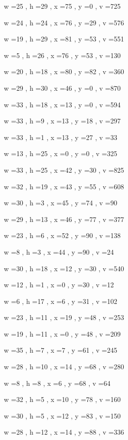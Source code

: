 \documentclass[11pt]{article}
\begin{document}
w =25 , h =29 , x =75 , y =0 , v =725
\par
w =24 , h =24 , x =76 , y =29 , v =576
\par
w =19 , h =29 , x =81 , y =53 , v =551
\par
w =5 , h =26 , x =76 , y =53 , v =130
\par
w =20 , h =18 , x =80 , y =82 , v =360
\par
w =29 , h =30 , x =46 , y =0 , v =870
\par
w =33 , h =18 , x =13 , y =0 , v =594
\par
w =33 , h =9 , x =13 , y =18 , v =297
\par
w =33 , h =1 , x =13 , y =27 , v =33
\par
w =13 , h =25 , x =0 , y =0 , v =325
\par
w =33 , h =25 , x =42 , y =30 , v =825
\par
w =32 , h =19 , x =43 , y =55 , v =608
\par
w =30 , h =3 , x =45 , y =74 , v =90
\par
w =29 , h =13 , x =46 , y =77 , v =377
\par
w =23 , h =6 , x =52 , y =90 , v =138
\par
w =8 , h =3 , x =44 , y =90 , v =24
\par
w =30 , h =18 , x =12 , y =30 , v =540
\par
w =12 , h =1 , x =0 , y =30 , v =12
\par
w =6 , h =17 , x =6 , y =31 , v =102
\par
w =23 , h =11 , x =19 , y =48 , v =253
\par
w =19 , h =11 , x =0 , y =48 , v =209
\par
w =35 , h =7 , x =7 , y =61 , v =245
\par
w =28 , h =10 , x =14 , y =68 , v =280
\par
w =8 , h =8 , x =6 , y =68 , v =64
\par
w =32 , h =5 , x =10 , y =78 , v =160
\par
w =30 , h =5 , x =12 , y =83 , v =150
\par
w =28 , h =12 , x =14 , y =88 , v =336
\par
\newpage
\end{document}
